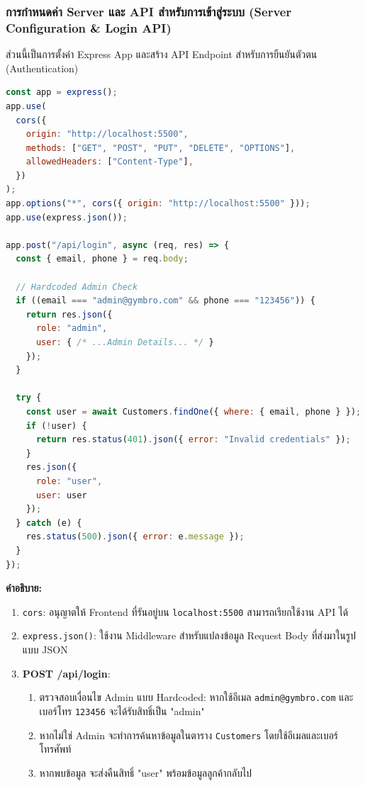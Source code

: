 \subsubsection{การกำหนดค่า Server และ API สำหรับการเข้าสู่ระบบ (Server Configuration \& Login API)}
ส่วนนี้เป็นการตั้งค่า Express App และสร้าง API Endpoint สำหรับการยืนยันตัวตน (Authentication)

\begin{lstlisting}[language=JavaScript, caption={ซอร์สโค้ดจากไฟล์ server.js}, label={code:server-js-login}]
const app = express();
app.use(
  cors({
    origin: "http://localhost:5500",
    methods: ["GET", "POST", "PUT", "DELETE", "OPTIONS"],
    allowedHeaders: ["Content-Type"],
  })
);
app.options("*", cors({ origin: "http://localhost:5500" }));
app.use(express.json());

app.post("/api/login", async (req, res) => {
  const { email, phone } = req.body;
  
  // Hardcoded Admin Check
  if ((email === "admin@gymbro.com" && phone === "123456")) {
    return res.json({
      role: "admin",
      user: { /* ...Admin Details... */ }
    });
  }

  try {
    const user = await Customers.findOne({ where: { email, phone } });
    if (!user) {
      return res.status(401).json({ error: "Invalid credentials" });
    }
    res.json({
      role: "user",
      user: user
    });
  } catch (e) {
    res.status(500).json({ error: e.message });
  }
});
\end{lstlisting}

\textbf{คำอธิบาย:}
\begin{enumerate}
    \item \texttt{cors}: อนุญาตให้ Frontend ที่รันอยู่บน \texttt{localhost:5500} สามารถเรียกใช้งาน API ได้
    \item \texttt{express.json()}: ใช้งาน Middleware สำหรับแปลงข้อมูล Request Body ที่ส่งมาในรูปแบบ JSON
    \item \textbf{POST /api/login}:
    \begin{enumerate}
        \item ตรวจสอบเงื่อนไข Admin แบบ Hardcoded: หากใช้อีเมล \texttt{admin@gymbro.com} และเบอร์โทร \texttt{123456} จะได้รับสิทธิ์เป็น "admin"
        \item หากไม่ใช่ Admin จะทำการค้นหาข้อมูลในตาราง \texttt{Customers} โดยใช้อีเมลและเบอร์โทรศัพท์
        \item หากพบข้อมูล จะส่งคืนสิทธิ์ "user" พร้อมข้อมูลลูกค้ากลับไป
    \end{enumerate}
\end{enumerate}

